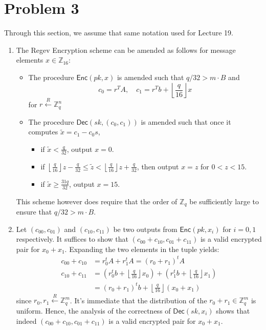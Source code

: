\documentclass[12pt]{article}%
\begin{document}
  \section*{Problem 3}
  Through this section, we assume that same notation used for Lecture 19.
  \begin{enumerate}
    \item The Regev Encryption scheme can be amended as follows for message elements $x \in \mathbb{Z}_{16}$:
    \begin{itemize}
       \item The procedure $\mathsf{Enc}(pk,x)$ is amended such that $q / 32 > m \cdot B$ and
       \[ c_0 = r^TA,\quad c_1 = r^{T}b + \left\lfloor \frac{q}{16} \right\rfloor x\]
       for $r \xleftarrow{R} \mathbb{Z}^n_q $
       \item The procedure $\mathsf{Dec}(sk,(c_0, c_1))$ is amended such that once it computes $\tilde{x} = c_1 - c_0s$,
       \begin{itemize}
         \item if $\tilde{x} < \frac{q}{32}$, output $x = 0$.
         \item if $ \left\lfloor \frac{q}{16} \right\rfloor z - \frac{q}{32} \leq \tilde{z} < \left\lfloor \frac{q}{16} \right\rfloor z + \frac{q}{32}$, then output $x = z$ for $0 < z < 15$.
         \item if $\tilde{x} \geq \frac{31q}{32}$, output $x = 15$.
       \end{itemize}
    \end{itemize}
    This scheme however does require that the order of $\mathbb{Z}_q$ be sufficiently large to ensure that $q / 32 > m \cdot B$.
    \item Let $(c_{00}, c_{01})$ and $(c_{10}, c_{11})$ be two outputs from $\mathsf{Enc}(pk, x_i)$ for $i = 0,1$ respectively. It suffices to show that $(c_{00} + c_{10}, c_{01} + c_{11})$ is a valid encrypted pair for $x_0 + x_1$. Expanding the two elements in the tuple yields:
    \begin{align*}
      c_{00} + c_{10} & = r_0^tA + r_1^tA = (r_0 + r_1)^tA \\
      c_{10} + c_{11} & = (r_0^tb + \left\lfloor \frac{q}{16} \right\rfloor x_0) + (r_1^tb + \left\lfloor \frac{q}{16} \right\rfloor x_1) \\
      & = (r_0 + r_1)^t b + \left\lfloor \frac{q}{16} \right\rfloor(x_0 + x_1)
    \end{align*}
    since $r_0, r_1 \xleftarrow{R} \mathbb{Z}_q^m$. It's immediate that the distribution of the $r_0 + r_1 \in \mathbb{Z}_q^m$ is uniform. Hence, the analysis of the correctness of $\mathsf{Dec}(sk, x_i)$ shows that indeed
    $(c_{00} + c_{10}, c_{01} + c_{11})$ is a valid encrypted pair for $x_0 + x_1$.
  \end{enumerate}
\newpage
\end{document}
